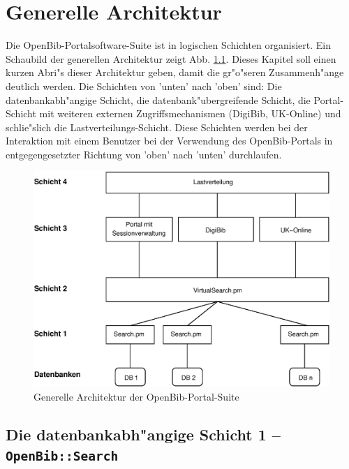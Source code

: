 \documentclass[11pt, twoside, a4paper, BCOR8mm, DIV12, bibtotoc,idxtotoc]{scrbook}
\begin{document}
\mainmatter

\chapter{Generelle Architektur}

Die OpenBib-Portalsoftware-Suite ist in logischen Schichten
organisiert. Ein Schaubild der ge\-ne\-rellen Architektur zeigt Abb.
\ref{bild:architektur}. Dieses Kapitel soll einen kurzen Abri"s dieser
Architektur geben, damit die gr"o"seren Zusammenh"ange deutlich
werden. Die Schichten von 'unten' nach 'oben' sind: Die
datenbankabh"angige Schicht, die datenbank"ubergreifende Schicht, die
Portal-Schicht mit weiteren externen Zugriffsmechanismen (DigiBib,
UK-Online) und schlie"slich die Lastverteilungs-Schicht. Diese
Schichten werden bei der Interaktion mit einem Benutzer bei der
Verwendung des OpenBib-Portals in entgegengesetzter Richtung von
'oben' nach 'unten' durchlaufen.


\begin{figure}
\begin{shadowenv}
  \vspace{4mm}
    \centering \begin{minipage}[b]{1.0\textwidth}
      \centering \includegraphics[width=12cm]{schicht04.eps}
    \end{minipage}
    \caption{Generelle Architektur der OpenBib-Portal-Suite}
  \label{bild:architektur}
  \vspace{3mm}
\end{shadowenv}
\end{figure}

\section{Die datenbankabh"angige Schicht 1 -- \texttt{OpenBib::Search}}
\end{document}

